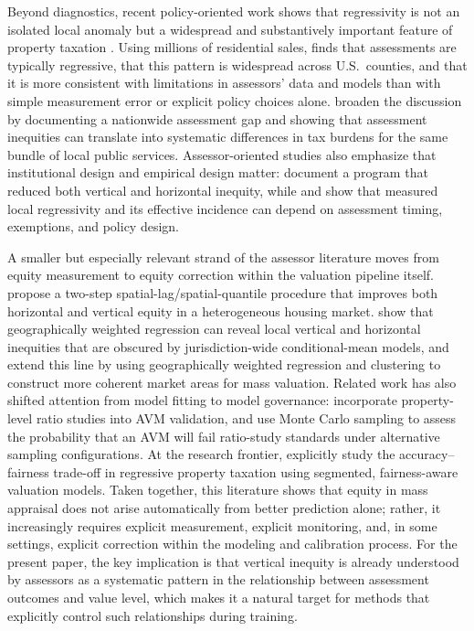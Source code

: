 \documentclass[12pt, draft]{article}
\theoremstyle{plain}
\theoremstyle{definition}
\newcommand{\1}{\mathbf{1}}
\begin{document}
Beyond diagnostics, recent policy-oriented work shows that regressivity is not an isolated local anomaly but a widespread and substantively important feature of property taxation \cite{Berry2021,AvenancioLeonHoward2022}. Using millions of residential sales, \textcite{Berry2021} finds that assessments are typically regressive, that this pattern is widespread across U.S.\ counties, and that it is more consistent with limitations in assessors' data and models than with simple measurement error or explicit policy choices alone. \textcite{AvenancioLeonHoward2022} broaden the discussion by documenting a nationwide assessment gap and showing that assessment inequities can translate into systematic differences in tax burdens for the same bundle of local public services. Assessor-oriented studies also emphasize that institutional design and empirical design matter: \textcite{ScottDaigle2022} document a program that reduced both vertical and horizontal inequity, while \textcite{Rakow2023} and \textcite{Rakow2024} show that measured local regressivity and its effective incidence can depend on assessment timing, exemptions, and policy design.

A smaller but especially relevant strand of the assessor literature moves from equity measurement to equity correction within the valuation pipeline itself. \textcite{Quintos2014} propose a two-step spatial-lag/spatial-quantile procedure that improves both horizontal and vertical equity in a heterogeneous housing market. \textcite{BidansetEtAl2019} show that geographically weighted regression can reveal local vertical and horizontal inequities that are obscured by jurisdiction-wide conditional-mean models, and \textcite{BidansetEtAl2025} extend this line by using geographically weighted regression and clustering to construct more coherent market areas for mass valuation. Related work has also shifted attention from model fitting to model governance: \textcite{HermansEtAl2022} incorporate property-level ratio studies into AVM validation, and \textcite{HermansEtAl2025} use Monte Carlo sampling to assess the probability that an AVM will fail ratio-study standards under alternative sampling configurations. At the research frontier, \textcite{CandoganHanLu2023} explicitly study the accuracy--fairness trade-off in regressive property taxation using segmented, fairness-aware valuation models. Taken together, this literature shows that equity in mass appraisal does not arise automatically from better prediction alone; rather, it increasingly requires explicit measurement, explicit monitoring, and, in some settings, explicit correction within the modeling and calibration process. For the present paper, the key implication is that vertical inequity is already understood by assessors as a systematic pattern in the relationship between assessment outcomes and value level, which makes it a natural target for methods that explicitly control such relationships during training.
\end{document}
